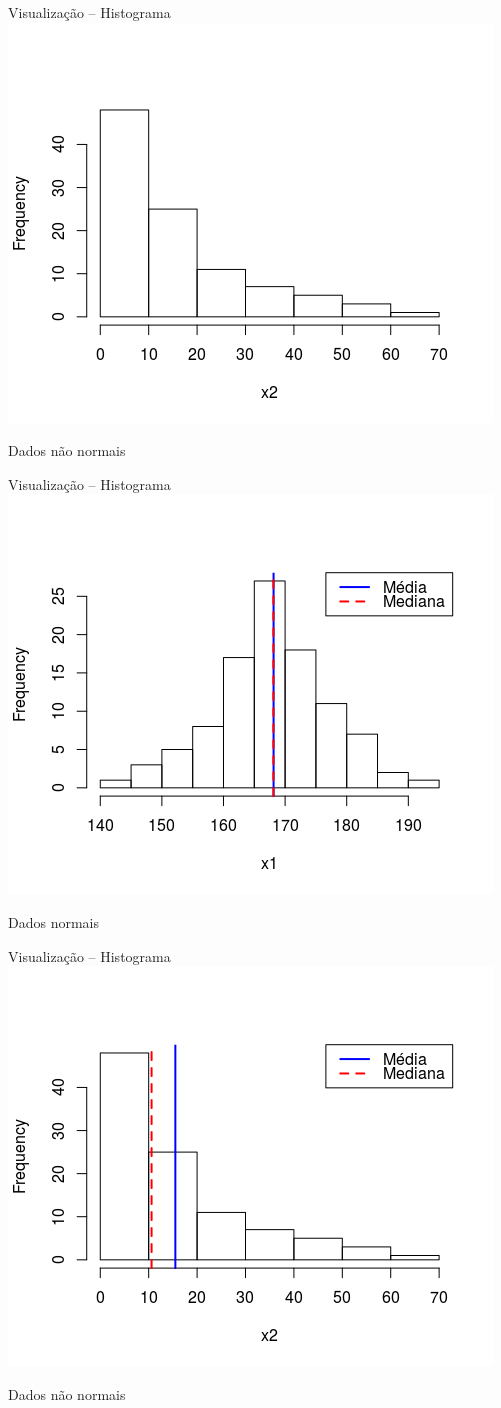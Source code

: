\documentclass{beamer}
\begin{document}
\begin{frame}{\scriptsize Visualização -- Histograma}
  \centering
  \includegraphics[width=.7\textwidth]{Cap37-38/lognormal1-h}

  Dados não normais
\end{frame}

\begin{frame}{\scriptsize Visualização -- Histograma}
  \centering
  \includegraphics[width=.7\textwidth]{Cap37-38/normal2-h}

  Dados normais
\end{frame}

\begin{frame}{\scriptsize Visualização -- Histograma}
  \centering
  \includegraphics[width=.7\textwidth]{Cap37-38/lognormal2-h}

  Dados não normais
\end{frame}
\end{document}
